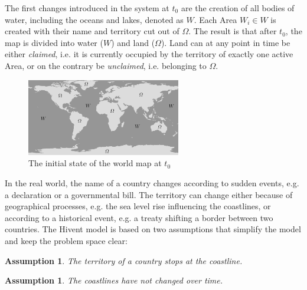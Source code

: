The first changes introduced in the system at $t_0$ are the creation of all bodies of water, including the oceans and lakes, denoted as $W$. Each Area $W_i \in W$ is created with their name and territory cut out of $\Omega$. The result is that after $t_0$, the map is divided into water ($W$) and land ($\Omega$). Land can at any point in time be either \emph{claimed}, i.e. it is currently occupied by the territory of exactly one active Area, or on the contrary be \emph{unclaimed}, i.e. belonging to $\Omega$.

\begin{figure}[ht]
  \centering
  \includegraphics[width=0.6\textwidth]{graphics/development/hivent_model/init_map}
  \caption{The initial state of the world map at $t_0$}
  \label{fig:init_map}
\end{figure}

In the real world, the name of a country changes according to sudden events, e.g. a declaration or a governmental bill. The territory can change either because of geographical processes, e.g. the sea level rise influencing the coastlines, or according to a historical event, e.g. a treaty shifting a border between two countries. The Hivent model is based on two assumptions that simplify the model and keep the problem space clear:

\vspace{-0.0em}
\newtheorem{coastline_territory}[assicounter]{Assumption}
\begin{coastline_territory}
\label{axm:coastline_territory}
  The territory of a country stops at the coastline.
\end{coastline_territory}

\vspace{-1.5em}
\newtheorem{constant_coastlines}[assicounter]{Assumption}
\begin{constant_coastlines}
\label{axm:constant_coastlines}
  The coastlines have not changed over time.
\end{constant_coastlines}

